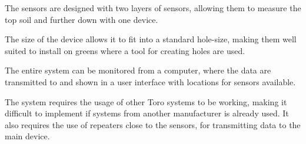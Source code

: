 The sensors are designed with two layers of sensors, allowing them to measure the top soil and further down with one device.

The size of the device allows it to fit into a standard hole-size, making them well suited to install on greens where a tool for creating holes are used\cite{turfGuard2}.

The entire system can be monitored from a computer, where the data are transmitted to and shown in a user interface with locations for sensors available\cite{turfGuard2}.

The system requires the usage of other Toro systems to be working, making it difficult to implement if systems from another manufacturer is already used. It also requires the use of repeaters close to the sensors, for transmitting data to the main device\cite{turfGuard2}.
